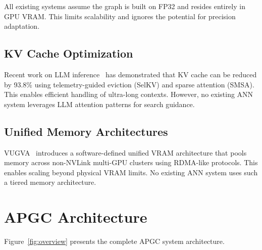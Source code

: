 \documentclass[11pt,twocolumn]{article}
\begin{document}
All existing systems assume the graph is built on FP32 and resides entirely in GPU VRAM. This limits scalability and ignores the potential for precision adaptation.

\subsection{KV Cache Optimization}

Recent work on LLM inference~\cite{opusedge2026} has demonstrated that KV cache can be reduced by 93.8\% using telemetry-guided eviction (SelKV) and sparse attention (SMSA). This enables efficient handling of ultra-long contexts. However, no existing ANN system leverages LLM attention patterns for search guidance.

\subsection{Unified Memory Architectures}

VUGVA~\cite{vugva2026} introduces a software-defined unified VRAM architecture that pools memory across non-NVLink multi-GPU clusters using RDMA-like protocols. This enables scaling beyond physical VRAM limits. No existing ANN system uses such a tiered memory architecture.

\section{APGC Architecture}
\label{sec:architecture}

Figure~\ref{fig:overview} presents the complete APGC system architecture.
\end{document}
